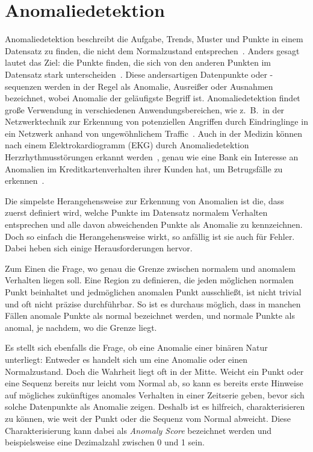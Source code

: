  \chapter{Anomaliedetektion}\label{ch:anomalien}
Anomaliedetektion beschreibt die Aufgabe, Trends, Muster und Punkte in einem Datensatz zu finden, die nicht dem Normalzustand
entsprechen~\cite{Chandola2009}. Anders gesagt lautet das Ziel: die Punkte finden, die sich von den anderen Punkten im Datensatz
stark unterscheiden~\cite[Kap.~10]{Tan2014}. Diese andersartigen Datenpunkte oder -sequenzen werden in der Regel als Anomalie,
Ausreißer oder Ausnahmen bezeichnet, wobei Anomalie der geläufigste Begriff ist. Anomaliedetektion findet große Verwendung in
verschiedenen Anwendungsbereichen, wie z.~B.~in der Netzwerktechnik zur Erkennung von potenziellen Angriffen durch Eindringlinge
in ein Netzwerk anhand von ungewöhnlichem Traffic~\Cite{Bernacki2015}. Auch in der Medizin können nach einem Elektrokardiogramm
(EKG) durch Anomaliedetektion Herzrhythmusstörungen erkannt werden~\cite{Chuah2007}, genau wie eine Bank ein Interesse
an Anomalien im Kreditkartenverhalten ihrer Kunden hat, um Betrugsfälle zu erkennen~\cite{Jiang2023, CeronmaniSharmila2019}.

Die simpelste Herangehensweise zur Erkennung von Anomalien ist die, dass zuerst definiert wird, welche Punkte im Datensatz normalem
Verhalten entsprechen und alle davon abweichenden Punkte als Anomalie zu kennzeichnen. Doch so einfach die Herangehensweise wirkt,
so anfällig ist sie auch für Fehler. Dabei heben sich einige Herausforderungen hervor.

Zum Einen die Frage, wo genau die Grenze zwischen normalem und anomalem Verhalten liegen soll. Eine Region zu definieren, die jeden 
möglichen normalen Punkt beinhaltet und jedmöglichen anomalen Punkt ausschließt, ist nicht trivial und oft nicht präzise durchführbar.
So ist es durchaus möglich, dass in manchen Fällen anomale Punkte als normal bezeichnet werden, und normale Punkte als anomal, je
nachdem, wo die Grenze liegt.

Es stellt sich ebenfalls die Frage, ob eine Anomalie einer binären Natur unterliegt: Entweder es handelt sich um eine Anomalie oder
einen Normalzustand. Doch die Wahrheit liegt oft in der Mitte. Weicht ein Punkt oder eine Sequenz bereits nur leicht vom Normal ab,
so kann es bereits erste Hinweise auf mögliches zukünftiges anomales Verhalten in einer Zeitserie geben, bevor sich solche Datenpunkte
als Anomalie zeigen. Deshalb ist es hilfreich, charakterisieren zu können, wie weit der Punkt oder die Sequenz
vom Normal abweicht. Diese Charakterisierung kann dabei als \textit{Anomaly Score} bezeichnet werden und beispielsweise eine Dezimalzahl
zwischen 0 und 1 sein.

